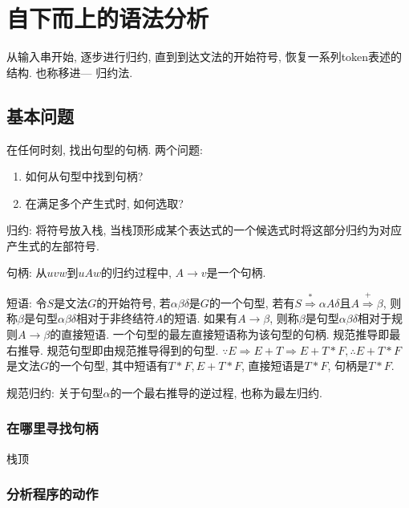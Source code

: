 \newcommand\eqdot{=\hskip -.8em\cdot\ }

\chapter{自下而上的语法分析}

    从输入串开始, 逐步进行\textsf{归约}, 直到到达文法的开始符号, 恢复一系列token表述的结构. 也称\textsf{移进--- 归约}法.

    \section{基本问题}

        在任何时刻, 找出句型的句柄. 两个问题:

        \begin{enumerate}
            \item 如何从句型中找到句柄?
            \item 在满足多个产生式时, 如何选取?
        \end{enumerate}

        \textsf{归约}: 将符号放入栈, 当栈顶形成某个表达式的一个候选式时将这部分归约为对应产生式的左部符号.

        \textsf{句柄}: 从$uvw$到$uAw$的归约过程中, $A\to v$是一个句柄.

        \textsf{短语}: 令$S$是文法$G$的开始符号, 若$\alpha\beta\delta$是$G$的一个句型, 若有$S\stackrel{*}{\Rightarrow}\alpha A\delta$且$A\stackrel{+}{\Rightarrow}\beta$, 则称$\beta$是句型$\alpha\beta\delta$相对于非终结符$A$的\textsf{短语}. 如果有$A\to\beta$, 则称$\beta$是句型$\alpha\beta\delta$相对于规则$A\to\beta$的\textsf{直接短语}. 一个句型的\textsf{最左直接短语}称为该句型的\textsf{句柄}. \textsf{规范推导}即最右推导. \textsf{规范句型}即由规范推导得到的句型. $\because E\Rightarrow E+T\Rightarrow E+T*F, \therefore E+T*F$是文法$G$的一个句型, 其中短语有$T*F, E+T*F$, 直接短语是$T*F$, 句柄是$T*F$.

        \textsf{规范归约}: 关于句型$\alpha$的一个最右推导的逆过程, 也称为\textsf{最左归约}.

        \subsection{在哪里寻找句柄}
            栈顶

        \subsection{分析程序的动作}

